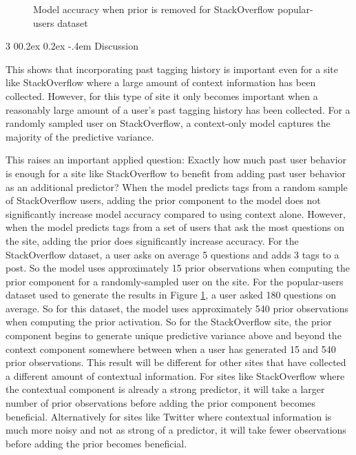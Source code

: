 \documentclass[man,floatsintext,donotrepeattitle]{apa6}
\makeatletter
\renewcommand{\subsubsection}{%
  \@startsection
  {subsubsection}%
  {3}%
  {\parindent}%
  {0\baselineskip \@plus 0.2ex \@minus 0.2ex}%
  {-.4em}%
  {\normalfont\normalsize\bfseries\addperi}}
\makeatother
\begin{document}
\begin{figure}[!htbp]
  \caption{Model accuracy when prior is removed for StackOverflow popular-users dataset}
  \label{figPUAddPrior}
\end{figure}

\subsubsection{Discussion}

This shows that incorporating past tagging history is important even for a site like StackOverflow where a large amount of context information has been collected.
However, for this type of site it only becomes important when a reasonably large amount of a user's past tagging history has been collected.
For a randomly sampled user on StackOverflow, a context-only model captures the majority of the predictive variance.

This raises an important applied question: Exactly how much past user behavior is enough for a site like StackOverflow to benefit from adding past user behavior as an additional predictor?
When the model predicts tags from a random sample of StackOverflow users, adding the prior component to the model does not significantly increase model accuracy compared to using context alone.
However, when the model predicts tags from a set of users that ask the most questions on the site, adding the prior does significantly increase accuracy.
For the StackOverflow dataset, a user asks on average 5 questions and adds 3 tags to a post.
So the model uses approximately 15 prior observations when computing the prior component for a randomly-sampled user on the site.
For the popular-users dataset used to generate the results in Figure \ref{figPUAddPrior}, a user asked 180 questions on average.
So for this dataset, the model uses approximately 540 prior observations when computing the prior activation.
So for the StackOverflow site, the prior component begins to generate unique predictive variance above and beyond the context component somewhere between when a user has generated 15 and 540 prior observations.
This result will be different for other sites that have collected a different amount of contextual information.
For sites like StackOverflow where the contextual component is already a strong predictor, it will take a larger number of prior observations before adding the prior component becomes beneficial.
Alternatively for sites like Twitter where contextual information is much more noisy and not as strong of a predictor, it will take fewer observations before adding the prior becomes beneficial.
\end{document}
